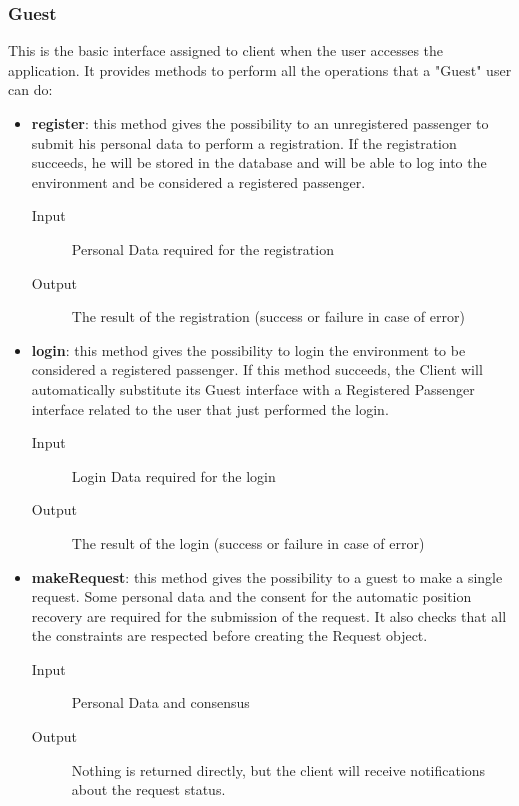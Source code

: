 		\subsubsection{Guest}
		This is the basic interface assigned to client when the user accesses the application.
		It provides methods to perform all the operations that a "Guest" user can do:
		\begin{itemize}
			\item \textbf{register}: this method gives the possibility to an unregistered passenger to
			submit his personal data to perform a registration. If the registration succeeds, he will be
			stored in the database and will be able to log into the environment and be considered a registered passenger.
			\begin{description}
				\item[Input] Personal Data required for the registration
				\item[Output] The result of the registration (success or failure in case of error)
			\end{description}
			\item \textbf{login}: this method gives the possibility to login the environment to be considered
			a registered passenger. If this method succeeds, the Client will automatically substitute its Guest
			interface with a Registered Passenger interface related to the user that just performed the login.
			\begin{description}
				\item[Input] Login Data required for the login
				\item[Output] The result of the login (success or failure in case of error)
			\end{description}
			\item \textbf{makeRequest}: this method gives the possibility to a guest to make a single request.
			Some personal data and the consent for the automatic position recovery are required for the submission
			of the request. It also checks that all the constraints are respected before creating the Request object.
			\begin{description}
				\item[Input] Personal Data and consensus
				\item[Output] Nothing is returned directly, but the client will receive notifications about the
				request status.
			\end{description}
		\end{itemize}
